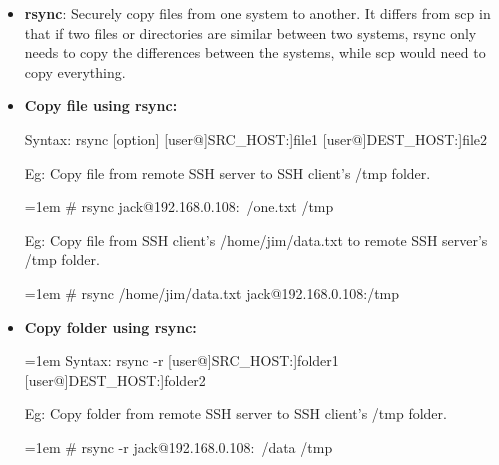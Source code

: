 \setlength{\columnsep}{3pt}
\begin{flushleft}

\bigskip
\begin{itemize}
	\item \textbf{rsync}: Securely copy files from one system to another. It differs from scp in that if two files or directories are similar between two systems, rsync only needs to copy the differences between the systems, while scp would need to copy everything.
	\bigskip
		
	\item \textbf{Copy file using rsync:}
	\begin{tcolorbox}[breakable,notitle,boxrule=0pt,colback=pink,colframe=pink]
		\color{black}

		Syntax: rsync [option] [user@]SRC\_HOST:]file1 [user@]DEST\_HOST:]file2

	\end{tcolorbox}
	
	\bigskip
	
	Eg: Copy file from remote SSH server to SSH client's /tmp folder.
	\begin{tcolorbox}[breakable,notitle,boxrule=-0pt,colback=black,colframe=black]
		\color{green}
		\font=1em
		\# rsync jack@192.168.0.108:~/one.txt  /tmp
		\font=4pt
	\end{tcolorbox}

	\bigskip
	
	Eg: Copy file from SSH client's /home/jim/data.txt to remote SSH server's /tmp folder.
	\begin{tcolorbox}[breakable,notitle,boxrule=-0pt,colback=black,colframe=black]
		\color{green}
		\font=1em
		\# rsync  /home/jim/data.txt  jack@192.168.0.108:/tmp
		\font=4pt
	\end{tcolorbox}

	\bigskip
	\bigskip
	\item \textbf{Copy folder using rsync:}
	\begin{tcolorbox}[breakable,notitle,boxrule=0pt,colback=pink,colframe=pink]
		\color{black}
		\font=1em
		Syntax: rsync -r [user@]SRC\_HOST:]folder1 [user@]DEST\_HOST:]folder2
		\font=4pt
	\end{tcolorbox}

	\bigskip

	Eg: Copy folder from remote SSH server to SSH client's /tmp folder.
	\begin{tcolorbox}[breakable,notitle,boxrule=-0pt,colback=black,colframe=black]
		\color{green}
		\font=1em
		\# rsync -r jack@192.168.0.108:~/data  /tmp
		\font=4pt
	\end{tcolorbox}
	

\end{itemize}
\end{flushleft}
